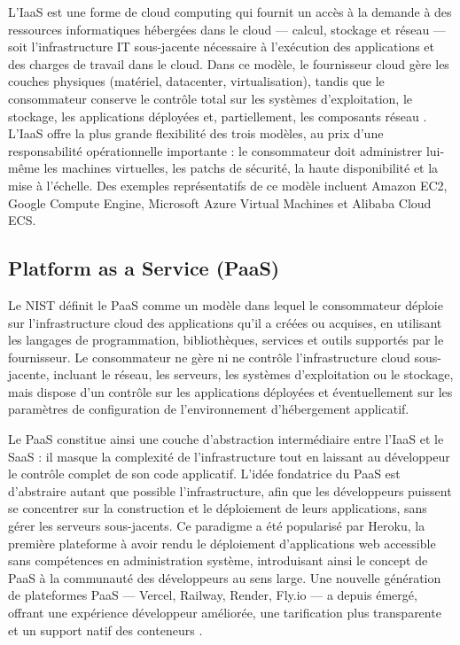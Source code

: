 L'IaaS est une forme de cloud computing qui fournit un accès à la demande à des ressources informatiques hébergées dans le cloud — calcul, stockage et réseau — soit l'infrastructure IT sous-jacente nécessaire à l'exécution des applications et des charges de travail dans le cloud.  Dans ce modèle, le fournisseur cloud gère les couches physiques (matériel, datacenter, virtualisation), tandis que le consommateur conserve le contrôle total sur les systèmes d'exploitation, le stockage, les applications déployées et, partiellement, les composants réseau \cite{nist-sp800-145}. L'IaaS offre la plus grande flexibilité des trois modèles, au prix d'une responsabilité opérationnelle importante : le consommateur doit administrer lui-même les machines virtuelles, les patchs de sécurité, la haute disponibilité et la mise à l'échelle. Des exemples représentatifs de ce modèle incluent Amazon EC2, Google Compute Engine, Microsoft Azure Virtual Machines et Alibaba Cloud ECS.

\subsection*{Platform as a Service (PaaS)}

Le NIST définit le PaaS comme un modèle dans lequel le consommateur déploie sur l'infrastructure cloud des applications qu'il a créées ou acquises, en utilisant les langages de programmation, bibliothèques, services et outils supportés par le fournisseur. Le consommateur ne gère ni ne contrôle l'infrastructure cloud sous-jacente, incluant le réseau, les serveurs, les systèmes d'exploitation ou le stockage, mais dispose d'un contrôle sur les applications déployées et éventuellement sur les paramètres de configuration de l'environnement d'hébergement applicatif. 

Le PaaS constitue ainsi une couche d'abstraction intermédiaire entre l'IaaS et le SaaS : il masque la complexité de l'infrastructure tout en laissant au développeur le contrôle complet de son code applicatif. L'idée fondatrice du PaaS est d'abstraire autant que possible l'infrastructure, afin que les développeurs puissent se concentrer sur la construction et le déploiement de leurs applications, sans gérer les serveurs sous-jacents.  Ce paradigme a été popularisé par Heroku, la première plateforme à avoir rendu le déploiement d'applications web accessible sans compétences en administration système, introduisant ainsi le concept de PaaS à la communauté des développeurs au sens large. Une nouvelle génération de plateformes PaaS — Vercel, Railway, Render, Fly.io — a depuis émergé, offrant une expérience développeur améliorée, une tarification plus transparente et un support natif des conteneurs \cite{paas-comparison}.

